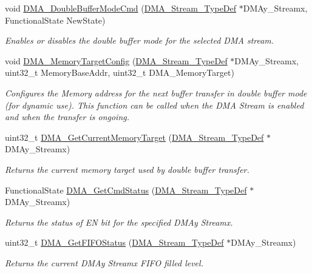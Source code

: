 \begin{DoxyCompactItemize}
void \hyperlink{group___d_m_a_ga7fe09e62ea3125db384829dab59ebe3e}{D\+M\+A\+\_\+\+Double\+Buffer\+Mode\+Cmd} (\hyperlink{struct_d_m_a___stream___type_def}{D\+M\+A\+\_\+\+Stream\+\_\+\+Type\+Def} $\ast$D\+M\+Ay\+\_\+\+Streamx, Functional\+State New\+State)
\begin{DoxyCompactList}\small\item\em Enables or disables the double buffer mode for the selected D\+MA stream. \end{DoxyCompactList}\item 
void \hyperlink{group___d_m_a_ga4ebcffd32eb6968ac61cfb64a6bae258}{D\+M\+A\+\_\+\+Memory\+Target\+Config} (\hyperlink{struct_d_m_a___stream___type_def}{D\+M\+A\+\_\+\+Stream\+\_\+\+Type\+Def} $\ast$D\+M\+Ay\+\_\+\+Streamx, uint32\+\_\+t Memory\+Base\+Addr, uint32\+\_\+t D\+M\+A\+\_\+\+Memory\+Target)
\begin{DoxyCompactList}\small\item\em Configures the Memory address for the next buffer transfer in double buffer mode (for dynamic use). This function can be called when the D\+MA Stream is enabled and when the transfer is ongoing. \end{DoxyCompactList}\item 
uint32\+\_\+t \hyperlink{group___d_m_a_ga74b6624f9faa2f43c9369ddbdeab241c}{D\+M\+A\+\_\+\+Get\+Current\+Memory\+Target} (\hyperlink{struct_d_m_a___stream___type_def}{D\+M\+A\+\_\+\+Stream\+\_\+\+Type\+Def} $\ast$D\+M\+Ay\+\_\+\+Streamx)
\begin{DoxyCompactList}\small\item\em Returns the current memory target used by double buffer transfer. \end{DoxyCompactList}\item 
Functional\+State \hyperlink{group___d_m_a_gaa4d631cdd6cd020106435f30c0c6fb15}{D\+M\+A\+\_\+\+Get\+Cmd\+Status} (\hyperlink{struct_d_m_a___stream___type_def}{D\+M\+A\+\_\+\+Stream\+\_\+\+Type\+Def} $\ast$D\+M\+Ay\+\_\+\+Streamx)
\begin{DoxyCompactList}\small\item\em Returns the status of EN bit for the specified D\+M\+Ay Streamx. \end{DoxyCompactList}\item 
uint32\+\_\+t \hyperlink{group___d_m_a_ga9893809a7067861ec111f7d712ebf28d}{D\+M\+A\+\_\+\+Get\+F\+I\+F\+O\+Status} (\hyperlink{struct_d_m_a___stream___type_def}{D\+M\+A\+\_\+\+Stream\+\_\+\+Type\+Def} $\ast$D\+M\+Ay\+\_\+\+Streamx)
\begin{DoxyCompactList}\small\item\em Returns the current D\+M\+Ay Streamx F\+I\+FO filled level. \end{DoxyCompactList}\item 

\end{DoxyCompactItemize}
